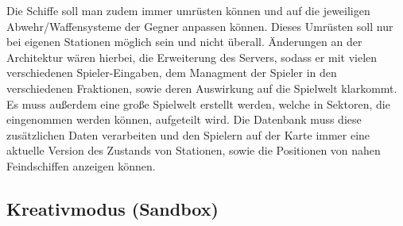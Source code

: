 \documentclass[fontsize=12pt,paper=a4,twoside]{scrartcl}
\begin{document}
 Die Schiffe soll man zudem immer umrüsten können und auf die jeweiligen Abwehr/Waffensysteme der Gegner anpassen können. Dieses Umrüsten soll nur bei eigenen Stationen möglich sein und nicht überall. 
 Änderungen an der Architektur wären hierbei, die Erweiterung des Servers, sodass er mit vielen verschiedenen Spieler-Eingaben, dem Managment der Spieler in den verschiedenen Fraktionen, sowie deren Auswirkung auf die Spielwelt klarkommt. Es muss außerdem eine große Spielwelt erstellt werden, welche in Sektoren, die eingenommen werden können, aufgeteilt wird. Die Datenbank muss diese zusätzlichen Daten verarbeiten und den Spielern auf der Karte immer eine aktuelle Version des Zustands von Stationen, sowie die Positionen von nahen Feindschiffen anzeigen können. 




\subsection{Kreativmodus (Sandbox)}
\end{document}
